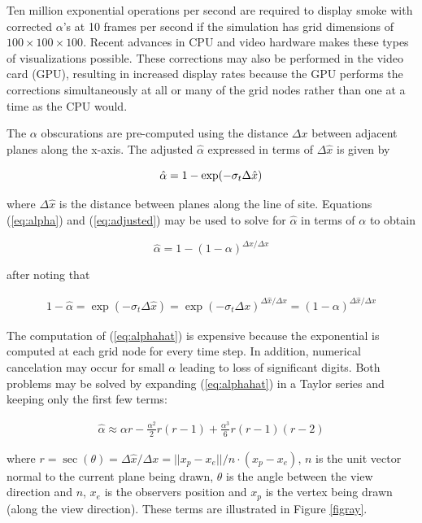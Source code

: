 Ten million exponential operations per second are required to display smoke with corrected $\alpha$'s at 10 frames per second if the simulation has grid dimensions of $100\times 100\times 100$. Recent advances in CPU and video hardware makes these types of visualizations possible. These corrections may also be performed in the video card (GPU), resulting in increased display rates because the GPU performs the corrections simultaneously at all or many of the grid nodes rather than one at a time as the CPU would.

The $\alpha$ obscurations are pre-computed using the distance $\Delta x$ between adjacent planes along the x-axis. The adjusted $\hat{\alpha}$ expressed in terms of $\Delta\hat{x}$ is given by

\begin{equation}
\label{eq:adjusted}
\hat{\alpha}=1-\exp(-\sigma_t\Delta \hat{x})\\
\end{equation}

where $\Delta\hat{x}$ is the distance between planes along the line of site.  Equations (\ref{eq:alpha}) and (\ref{eq:adjusted}) may be used to solve for $\hat{\alpha}$ in terms of $\alpha$ to obtain

\begin{equation}
\label{eq:alphahat}
\hat{\alpha}=1-(1-\alpha)^{\Delta\hat{x}/\Delta x}
\end{equation}

after noting that

\begin{eqnarray*}
1-\hat{\alpha}=\exp(-\sigma_t\Delta\hat{x})=\exp(-\sigma_t\Delta
x)^{\Delta\hat{x}/\Delta x}=(1-\alpha)^{\Delta\hat{x}/\Delta x}
\end{eqnarray*}

The computation of (\ref{eq:alphahat}) is expensive because the exponential is computed at each grid node for every time step.  In addition, numerical cancelation may occur for small $\alpha$ leading to loss of significant digits. Both problems may be solved by expanding (\ref{eq:alphahat}) in a Taylor series and keeping only the first few terms:

\begin{eqnarray*}
\hat{\alpha}\approx \alpha r -
\frac{\alpha^2}{2}r(r-1)+\frac{\alpha^3}{6}r(r-1)(r-2)
\end{eqnarray*}

where $r=\sec(\theta)=\Delta \hat{x}/\Delta x=||x_p-x_e||/n\cdot(x_p-x_e)$, $n$ is the unit vector normal to the current plane being drawn, $\theta$ is the angle between the view direction and $n$, $x_e$ is the observers position and $x_p$ is the vertex being drawn (along the view direction).  These terms are illustrated in Figure \ref{figray}.

